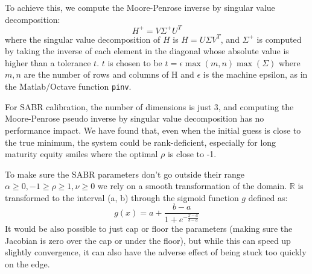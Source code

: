 \documentclass[]{rAMF2e}
\begin{document}
To achieve this, we compute the Moore-Penrose inverse by singular value decomposition:
\begin{equation}
H^+ = V \Sigma^+ U^T
\end{equation}
where the singular value decomposition of $H$ is $H = U \Sigma V^T$, and $\Sigma^+$ is computed by taking the inverse of each element in the diagonal whose absolute value is higher than a tolerance $t$. $t$ is chosen to be $t=\epsilon \max(m,n) \max(\Sigma)$ where $m,n$ are the number of rows and columns of H and $\epsilon$ is the machine epsilon, as in the Matlab/Octave function \texttt{pinv}.

For SABR calibration, the number of dimensions is just 3, and computing the Moore-Penrose pseudo inverse by singular value decomposition has no performance impact. We have found that, even when the initial guess is close to the true minimum, the system could be rank-deficient, especially for long maturity equity smiles where the optimal $\rho$ is close to -1.

To make sure the SABR parameters don't go outside their range $\alpha \geq 0, -1 \geq \rho \geq 1, \nu \geq 0$ we rely on a smooth transformation of the domain. $\mathbb{R}$ is transformed to the interval (a, b) through the sigmoid function $g$ defined as:
\begin{equation}
g(x) = a + \frac{b-a}{1+e^{-\frac{x-a}{b-a}}}
\end{equation}
It would be also possible to just cap or floor the parameters (making sure the Jacobian is zero over the cap or under the floor), but while this can speed up slightly convergence, it can also have the adverse effect of being stuck too quickly on the edge.


%

\end{document}

